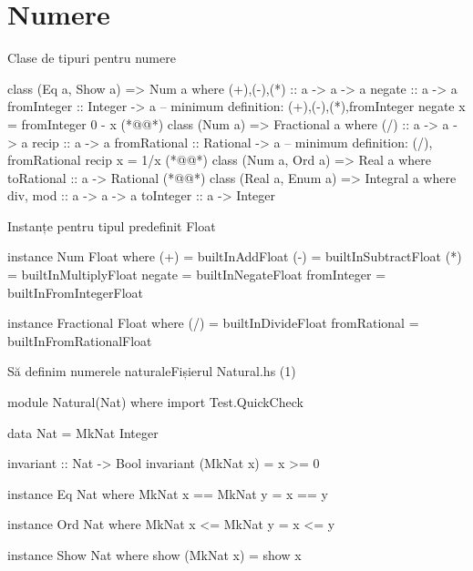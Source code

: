 \documentclass[xcolor=pdftex,romanian,colorlinks]{beamer}
\begin{document}
\section{Numere}
\begin{frame}[fragile]{Clase de tipuri pentru numere}
\vspace{-2ex}
\begin{asciihs}
  class (Eq a, Show a) => Num a where
    (+),(-),(*)   :: a -> a -> a
    negate        :: a -> a
    fromInteger   :: Integer -> a
    -- minimum definition: (+),(-),(*),fromInteger
    negate x      =   fromInteger 0 - x
(*@\vspace{-1ex}@*)
  class (Num a) => Fractional a where
    (/)           :: a -> a -> a
    recip         :: a -> a
    fromRational :: Rational -> a
    -- minimum definition: (/), fromRational
    recip x       =   1/x
(*@\vspace{-1ex}@*)
  class (Num a, Ord a) => Real a where
    toRational    :: a -> Rational
(*@\vspace{-1ex}@*)
  class (Real a, Enum a) => Integral a where
    div, mod      :: a -> a -> a
    toInteger     :: a -> Integer
\end{asciihs}
\end{frame}
\begin{frame}[fragile]{Instanțe pentru tipul predefinit Float}
\begin{asciihs}
  instance Num Float   where
    (+)           =    builtInAddFloat
    (-)           =    builtInSubtractFloat
    (*)           =    builtInMultiplyFloat
    negate        =    builtInNegateFloat
    fromInteger   =    builtInFromIntegerFloat

  instance Fractional Float where
    (/)           = builtInDivideFloat
    fromRational = builtInFromRationalFloat
\end{asciihs}
\end{frame}
\begin{frame}[fragile]{Să definim numerele naturale}{Fișierul Natural.hs \hfill(1)}
\begin{asciihs}
  module Natural(Nat) where
  import Test.QuickCheck

  data Nat = MkNat Integer

  invariant :: Nat -> Bool
  invariant (MkNat x) = x >= 0

  instance Eq Nat where
    MkNat x == MkNat y = x == y

  instance Ord Nat where
    MkNat x <= MkNat y = x <= y

  instance Show Nat where
    show (MkNat x) = show x
\end{asciihs}
\end{frame}
\end{document}
